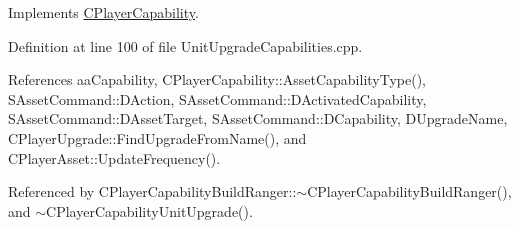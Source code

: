 Implements \hyperlink{classCPlayerCapability_a2ca6fd7fbd9c0178f1cf1d049c63825f}{C\+Player\+Capability}.



Definition at line 100 of file Unit\+Upgrade\+Capabilities.\+cpp.



References aa\+Capability, C\+Player\+Capability\+::\+Asset\+Capability\+Type(), S\+Asset\+Command\+::\+D\+Action, S\+Asset\+Command\+::\+D\+Activated\+Capability, S\+Asset\+Command\+::\+D\+Asset\+Target, S\+Asset\+Command\+::\+D\+Capability, D\+Upgrade\+Name, C\+Player\+Upgrade\+::\+Find\+Upgrade\+From\+Name(), and C\+Player\+Asset\+::\+Update\+Frequency().



Referenced by C\+Player\+Capability\+Build\+Ranger\+::$\sim$\+C\+Player\+Capability\+Build\+Ranger(), and $\sim$\+C\+Player\+Capability\+Unit\+Upgrade().


